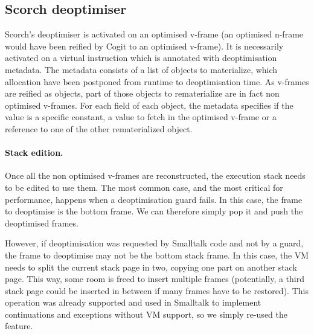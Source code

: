 \documentclass[a4paper,12pt,twoside]{../includes/ThesisStyle}
\begin{document}

\subsection{Scorch deoptimiser}

Scorch's deoptimiser is activated on an optimised v-frame (an optimised n-frame would have been reified by Cogit to an optimised v-frame). It is necessarily activated on a virtual instruction which is annotated with deoptimisation metadata. The metadata consists of a list of objects to materialize, which allocation have been postponed from runtime to deoptimisation time. As v-frames are reified as objects, part of those objects to rematerialize are in fact non optimised v-frames. For each field of each object, the metadata specifies if the value is a specific constant, a value to fetch in the optimised v-frame or a reference to one of the other rematerialized object.

\paragraph{Stack edition.}


Once all the non optimised v-frames are reconstructed, the execution stack needs to be edited to use them. The most common case, and the most critical for performance, happens when a deoptimisation guard fails. In this case, the frame to deoptimise is the bottom frame. We can therefore simply pop it and push the deoptimised frames.

However, if deoptimisation was requested by Smalltalk code and not by a guard, the frame to deoptimise may not be the bottom stack frame. In this case, the VM needs to split the current stack page in two, copying one part on another stack page. This way, some room is freed to insert multiple frames (potentially, a third stack page could be inserted in between if many frames have to be restored). This operation was already supported and used in Smalltalk to implement continuations and exceptions without VM support, so we simply re-used the feature.
\end{document}
